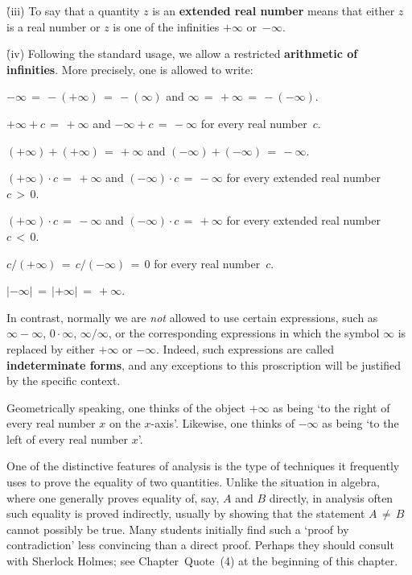\VA

        \h (iii) To say that a quantity $z$ is an {\bf extended real number}
    means that either $z$ is a real number or $z$ is one of the infinities $+{\infty}$ or~$-{\infty}$.

\VA

        \h (iv) Following the standard usage, we allow a restricted {\bf arithmetic of infinities}.
    More precisely, one is allowed to write:

        $-{\infty} \,=\, -(+{\infty}) \,=\, -({\infty})$ and ${\infty} \,=\, +{\infty} \,=\, -(-{\infty})$.

        $+{\infty}+c \,=\, +{\infty}$ and $-{\infty}+c \,=\, -{\infty}$ for every real number~$c$.

        $(+{\infty})+(+{\infty}) \,=\, +{\infty}$ and $(-{\infty})+(-{\infty}) \,=\, -{\infty}$.

        $(+{\infty}){\cdot}c \,=\, +{\infty}$ and $(-{\infty}){\cdot}c \,=\, -{\infty}$ for every extended real number $c\,>\,0$.

        $(+{\infty}){\cdot}c \,=\, -{\infty}$ and $(-{\infty}){\cdot}c \,=\, +{\infty}$ for every extended real number $c\,<\,0$.

        $c/(+{\infty}) \,=\, c/(-{\infty}) \,=\, 0$ for every real number~$c$.

        $|-{\infty}| \,=\, |+{\infty}| \,=\, +{\infty}$.

        In contrast, normally we are {\em not} allowed to use certain expressions,
    such as ${\infty}-{\infty}$, $0{\cdot}{\infty}$, ${\infty}/{\infty}$, or the corresponding expressions in which the symbol ${\infty}$ is replaced by either $+{\infty}$ or $-{\infty}$.
    Indeed, such expressions are called {\bf indeterminate forms},
    and any exceptions to this proscription will be justified by the specific context.


\V

        Geometrically speaking, one thinks of the object $+{\infty}$ as being `to the right of every real number $x$ on the $x$-axis'.
    Likewise, one thinks of $-{\infty}$ as being `to the left of every real number $x$'.

\VV

        One of the distinctive features of analysis is  the type of techniques it frequently uses to prove the equality of two quantities.
    Unlike the situation in algebra, where one generally proves equality of, say, $A$ and $B$ directly, in analysis often such equality is proved indirectly,
    usually by showing that the statement $A\,{\neq}\,B$ cannot possibly be true.
    Many students initially find such a `proof by contradiction' less convincing than a direct proof.
    Perhaps they should consult with Sherlock Holmes; see Chapter~Quote~(4) at the beginning of this chapter.

